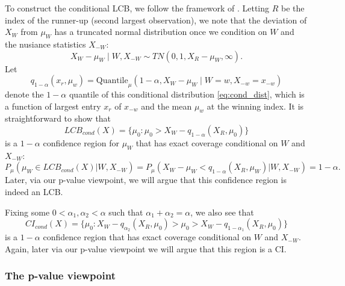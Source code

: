 \documentclass{article}
\begin{document}
\begin{appendix}
To construct the conditional LCB, we follow the framework of \cite{Fithian2017}. Letting $R$ be the index of the runner-up (second largest observation), we note that the deviation of $X_{W}$ from $\mu_{W}$ has a truncated normal distribution once we condition on $W$ and the nusiance statistics $X_{-W}$:
\begin{equation}
    \label{eq:cond_dist}
    X_W - \mu_W \mid W, X_{-W} \sim TN(0, 1, X_{R} - \mu_{W}, \infty).
\end{equation}
Let
\begin{equation}
    \label{eq:cond_quantile}
    q_{1-\alpha}(x_r, \mu_w) = \text{Quantile}_{\mu}(1-\alpha, X_W -  \mu_{W} \mid W=w, X_{-w} = x_{-w})
\end{equation}
denote the $1-\alpha$ quantile of this conditional distribution \eqref{eq:cond_dist}, which is a function of largest entry $x_r$ of $x_{-w}$ and the mean $\mu_w$ at the winning index. It is straightforward to show that
\begin{equation}
\label{eq:cond_lcb}
     LCB_{cond}(X) = \{\mu_0 : \mu_0 > X_{W} - q_{1-\alpha}(X_R, \mu_0)  \} 
\end{equation}
is a $1-\alpha$ confidence region for $\mu_{W}$ that has exact coverage conditional on $W$ and  $X_{-W}$:
\begin{equation*}
    P_{\mu}( \mu_{W} \in LCB_{cond}(X) | W, X_{-W})  = P_{\mu}( X_W - \mu_W < q_{1-\alpha}(X_R,\mu_{W}) |W, X_{-W}) = 1-\alpha.
\end{equation*}
Later, via our p-value viewpoint, we will argue that this confidence region is indeed an LCB. 

Fixing some $0 < \alpha_1, \alpha_2 < \alpha$ such that $\alpha_1 + \alpha_2 = \alpha$, we also see that 
\begin{equation}
    \label{eq:cond_ci}
        CI_{cond}(X) = \{\mu_0 : X_W - q_{\alpha_2}(X_R, \mu_0) > \mu_0 > X_W - q_{1-\alpha_1}(X_R, \mu_0)  \} 
\end{equation}
is a $1-\alpha$ confidence region that has exact coverage conditional on $W$ and $X_{-W}$. Again, later via our p-value viewpoint we will argue that this region is a CI. 

\subsubsection{The p-value viewpoint }


\end{appendix}
\end{document}

